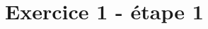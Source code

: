 \documentclass[
  12pt,
  openany]{book}
\subtitle{test}
\author{}
\date{}
\begin{document}
\frontmatter


\mainmatter
\thispagestyle{fancy}

\chapter{Exercice 1 - étape 1}\label{exercice-1---uxe9tape-1}


\backmatter
\end{document}
